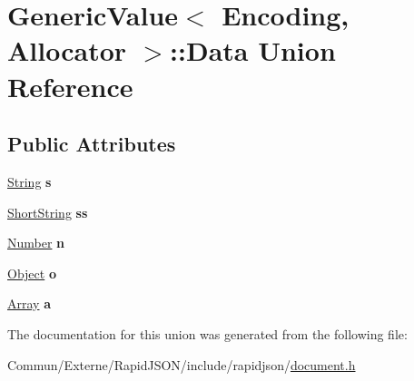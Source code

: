 \hypertarget{union_generic_value_1_1_data}{}\section{Generic\+Value$<$ Encoding, Allocator $>$\+:\+:Data Union Reference}
\label{union_generic_value_1_1_data}
\subsection*{Public Attributes}
\begin{DoxyCompactItemize}
\item 
\hyperlink{struct_generic_value_1_1_string}{String} {\bfseries s}\hypertarget{union_generic_value_1_1_data_a6872a4b93763944063b425e6c001ed2b}{}\label{union_generic_value_1_1_data_a6872a4b93763944063b425e6c001ed2b}

\item 
\hyperlink{struct_generic_value_1_1_short_string}{Short\+String} {\bfseries ss}\hypertarget{union_generic_value_1_1_data_a410e39a5dc296eb3b152b54193740e4c}{}\label{union_generic_value_1_1_data_a410e39a5dc296eb3b152b54193740e4c}

\item 
\hyperlink{union_generic_value_1_1_number}{Number} {\bfseries n}\hypertarget{union_generic_value_1_1_data_a243007cce2f4b75bea3e3c1ee4c3c239}{}\label{union_generic_value_1_1_data_a243007cce2f4b75bea3e3c1ee4c3c239}

\item 
\hyperlink{struct_generic_value_1_1_object}{Object} {\bfseries o}\hypertarget{union_generic_value_1_1_data_a15c6847aa3272560aaff5e7ed4320a7f}{}\label{union_generic_value_1_1_data_a15c6847aa3272560aaff5e7ed4320a7f}

\item 
\hyperlink{struct_generic_value_1_1_array}{Array} {\bfseries a}\hypertarget{union_generic_value_1_1_data_a1935b99b33ec9deff9f6360f8fa7b812}{}\label{union_generic_value_1_1_data_a1935b99b33ec9deff9f6360f8fa7b812}

\end{DoxyCompactItemize}


The documentation for this union was generated from the following file\+:\begin{DoxyCompactItemize}
\item 
Commun/\+Externe/\+Rapid\+J\+S\+O\+N/include/rapidjson/\hyperlink{document_8h}{document.\+h}\end{DoxyCompactItemize}
